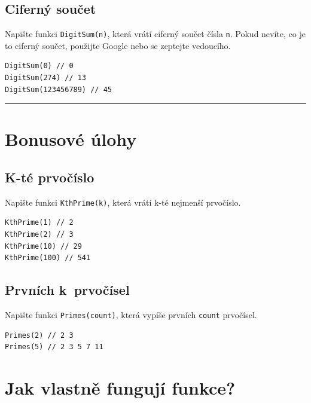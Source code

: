 \documentclass[12pt,a4paper]{article}
\begin{document}
\begin{multicols}{2}
\section{Ciferný součet}

Napište funkci \texttt{DigitSum(n)}, která vrátí ciferný součet čísla
\texttt{n}. Pokud nevíte, co je to ciferný součet, použijte Google nebo se
zeptejte vedoucího.

\begin{verbatim}
DigitSum(0) // 0
DigitSum(274) // 13
DigitSum(123456789) // 45
\end{verbatim}

\end{multicols}

\noindent\rule{\textwidth}{1pt}
\section*{Bonusové úlohy}

\begin{multicols}{2}

\subsection{K-té prvočíslo}

Napište funkci \texttt{KthPrime(k)}, která vrátí k-té nejmenší prvočíslo.

\begin{verbatim}
KthPrime(1) // 2
KthPrime(2) // 3
KthPrime(10) // 29
KthPrime(100) // 541
\end{verbatim}

\subsection{Prvních k~prvočísel}

Napište funkci \texttt{Primes(count)}, která vypíše prvních \texttt{count}
prvočísel.

\begin{verbatim}
Primes(2) // 2 3
Primes(5) // 2 3 5 7 11
\end{verbatim}

\end{multicols}

\newpage

\section*{Jak vlastně fungují funkce?}
\end{document}
